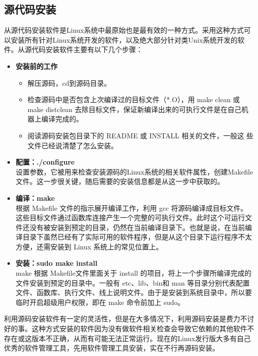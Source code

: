 \subsection{源代码安装}
从源代码安装软件是Linux系统中最原始也是最有效的一种方式。采用这种方式可以安装所有针对Linux系统开发的软件，以及绝大部分针对类Unix系统开发的软件。从源代码安装软件主要有以下几个步骤：
\begin{itemize}
\item \textbf{安装前的工作}
	\begin{itemize}
	\item 解压源码，cd到源码目录。
	
	\item 检查源码中是否包含上次编译过的目标文件（*.O），用 make clean 		或 make distclean 去除目标文件，保证新编译出来的可执行文件是在自己机器上编译完成的。

	\item 阅读源码安装包目录下的 README 或 INSTALL 相关的文件，一般这		些文件已经说清楚了怎么安装。
	\end{itemize}
	
\item
\textbf{配置：./configure} \\
设置参数，它被用来检查安装源码的Linux系统的相关软件属性，创建Makefile文件。这一步很关键，随后需要的安装信息都是从这一步中获取的。

\item 
\textbf{编译：make} \\
根据 Makefile 文件的指示展开编译工作，利用 gcc 将源码编译成目标文件。这些目标文件通过函数库连接产生一个完整的可执行文件。此时这个可运行文件还没有被安装到预定的目录，仍然在当前编译目录下。也就是说，在当前编译目录下虽然已经有了实际可用的软件程序，但是从这个目录下运行程序不太方便，还需安装到 Linux 系统上的常见位置上。

\item
\textbf{安装：sudo make install}\\
make 根据 Makefile文件里面关于 install 的项目，将上一个步骤所编译完成的文件安装到预定的目录中。一般有 etc、lib、bin和 man 等目录分别代表配置文件、函数库、执行文件、线上说明文件。由于是安装到系统目录中，所以要临时开启超级用户权限，即在 make 命令前加上 sudo。
\end{itemize}

利用源码安装软件有一定的灵活性，但是在大多情况下，利用源码安装是费力不讨好的事。这种方式安装的软件因为没有做软件相关检查会导致它依赖的其他软件不存在或这版本不正确，从而有可能无法正常运行。现在的Linux发行版大多有自己优秀的软件管理工具，先用软件管理工具安装，实在不行再源码安装。



